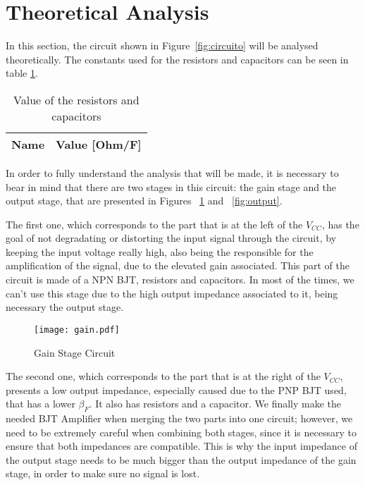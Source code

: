 \section{Theoretical Analysis}
\label{sec:analysis}

\hspace{0,5cm} In this section, the  circuit shown in Figure~\ref{fig:circuito} will be analysed theoretically.
The constants used for the resistors and capacitors can be seen in table \ref{tab:mat1}.

\begin{table}[H]
  \centering
  \begin{tabular}{|l|r|}
    \hline    
    {\bf Name} & {\bf Value [Ohm/F]} \\ \hline
    
  \end{tabular}
  \caption{Value of the resistors and capacitors}
  \label{tab:mat1}
\end{table}

In order to fully understand the analysis that will be made, it is necessary to bear in mind that there are two stages in this circuit: the gain stage and the output stage, that are presented in Figures ~\ref{fig:gain} and ~\ref{fig:output}. 

The first one, which corresponds to the part that is at the left of the $V_{CC}$, has the goal of not degradating or distorting the input signal through the circuit, by keeping the input voltage really high, also being the responsible for the amplification of the signal, due to the elevated gain associated. This part of the circuit is made of a NPN BJT, resistors and capacitors. In most of the times, we can't use this stage due to the high output impedance associated to it, being necessary the output stage.


\begin{figure}[H] \centering
\texttt{[image: gain.pdf]}
\caption{Gain Stage Circuit}
\label{fig:gain}
\end{figure}


The second one, which corresponds to the part that is at the right of the $V_{CC}$, presents a low output impedance, especially caused due to the PNP BJT used, that has a lower $\beta_F$. It also has resistors and a capacitor. We finally make the needed BJT Amplifier when merging the two parts into one circuit; however, we need to be extremely careful when combining both stages, since it is necessary to ensure that both impedances are compatible. This is why the input impedance of the output stage needs to be much bigger than the output impedance of the gain stage, in order to make sure no signal is lost.

